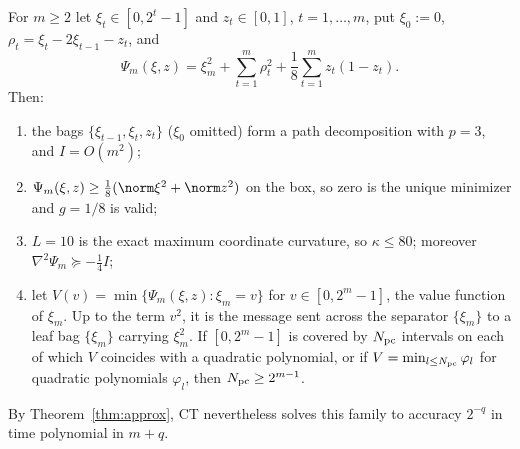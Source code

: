 \begin{proposition}
\label{lim:prop:messages}
For $m\ge2$ let $\xi_t\in[0,2^t-1]$ and $z_t\in[0,1]$, $t=1,\ldots,m$, put
$\xi_0:=0$, $\rho_t=\xi_t-2\xi_{t-1}-z_t$, and
\[
\Psi_m(\xi,z)=\xi_m^2+\sum_{t=1}^m\rho_t^2+\frac18\sum_{t=1}^mz_t(1-z_t).
\]
Then:
\begin{enumerate}
\item the bags $\{\xi_{t-1},\xi_t,z_t\}$ ($\xi_0$ omitted) form a path
  decomposition with $p=3$, and $I=O(m^2)$;
\item $\Psi_m(\xi,z)\ge\frac18(\norm\xi^2+\norm z^2)$ on the box, so zero is
  the unique minimizer and $g=1/8$ is valid;
\item $L=10$ is the exact maximum coordinate curvature, so $\kappa\le80$;
  moreover $\nabla^2\Psi_m\succeq-\frac14I$;
\item let $V(v)=\min\{\Psi_m(\xi,z):\xi_m=v\}$ for $v\in[0,2^m-1]$, the
  value function of $\xi_m$. Up to the term $v^2$, it is the message sent
  across the separator $\{\xi_m\}$ to a leaf bag $\{\xi_m\}$ carrying
  $\xi_m^2$. If $[0,2^m-1]$ is covered by $N_{\rm pc}$ intervals on each of
  which $V$ coincides with a quadratic polynomial, or if
  $V=\min_{l\le N_{\rm pc}}\varphi_l$ for quadratic polynomials $\varphi_l$,
  then $N_{\rm pc}\ge2^{m-1}$.
\end{enumerate}
By Theorem~\ref{thm:approx}, CT nevertheless solves this family to accuracy
$2^{-q}$ in time polynomial in $m+q$.
\end{proposition}

